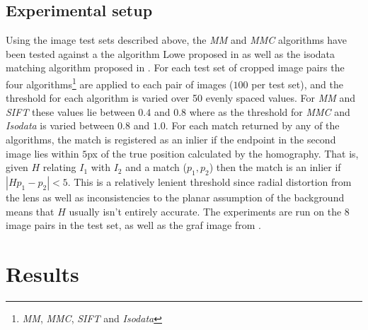 \documentclass{article}
\begin{document}
\subsection{Experimental setup}

Using the image test sets described above, the \emph{MM} and \emph{MMC} 
algorithms have been tested against a the algorithm Lowe proposed in 
\cite{lowe2004sift} as well as the isodata matching algorithm proposed 
in \cite{das2008event}.  For each test set of cropped image pairs the 
four algorithms\footnote{\emph{MM}, \emph{MMC}, \emph{SIFT} and 
\emph{Isodata}} are applied to each pair of images ($100$ per test set), 
and the threshold for each algorithm is varied over 50 evenly spaced 
values.  For \emph{MM} and \emph{SIFT} these values lie between $0.4$ 
and $0.8$ where as the threshold for \emph{MMC} and \emph{Isodata} is 
varied between $0.8$ and $1.0$.  For each match returned by any of the 
algorithms, the match is registered as an inlier if the endpoint in the 
second image lies within $5$px of the true position calculated by the 
homography.  That is, given $H$ relating $I_1$ with $I_2$ and a match 
($p_1, p_2$) then the match is an inlier if $\left\vert Hp_1 - p_2 
\right\vert < 5$.  This is a relatively lenient threshold since radial 
distortion from the lens as well as inconsistencies to the planar 
assumption of the background means that $H$ usually isn't entirely 
accurate. The experiments are run on the $8$ image pairs in the test 
set, as well as the graf image from \cite{mikolajczyk2005performance}.

\section{Results}
\label{results}
\end{document}
